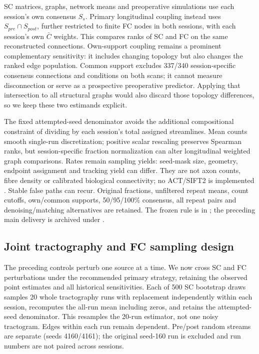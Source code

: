 \documentclass[11pt,a4paper]{article}
\begin{document}
SC matrices, graphs, network means and preoperative simulations use each session's own consensus $S_s$. Primary longitudinal coupling instead uses $S_{pre}\cap S_{post}$, further restricted to finite FC nodes in both sessions, with each session's own $\bar C$ weights. This compares ranks of SC and FC on the same reconstructed connections. Own-support coupling remains a prominent complementary sensitivity: it includes changing topology but also changes the ranked edge population. Common support excludes 337/340 session-specific consensus connections and conditions on both scans; it cannot measure disconnection or serve as a prospective preoperative predictor. Applying that intersection to all structural graphs would also discard those topology differences, so we keep these two estimands explicit.

The fixed attempted-seed denominator avoids the additional compositional constraint of dividing by each session's total assigned streamlines. Mean counts smooth single-run discretization; positive scalar rescaling preserves Spearman ranks, but session-specific fraction normalization can alter longitudinal weighted graph comparisons. Rates remain sampling yields: seed-mask size, geometry, endpoint assignment and tracking yield can differ. They are not axon counts, fibre density or calibrated biological connectivity; no ACT/SIFT2 is implemented \citep{maierhein2017,mrtrixconnectome}. Stable false paths can recur. Original fractions, unfiltered repeat means, count cutoffs, own/common supports, 50/95/100\% consensus, all repeat pairs and denoising/matching alternatives are retained. The frozen rule is in ; the preceding main delivery is archived under .

\subsection{Joint tractography and FC sampling design}\label{sec:jointmethods}
The preceding controls perturb one source at a time. We now cross SC and FC perturbations under the recommended primary strategy, retaining the observed point estimates and all historical sensitivities. Each of 500 SC bootstrap draws samples 20 whole tractography runs with replacement independently within each session, recomputes the all-run mean including zeros, and retains the attempted-seed denominator. This resamples the 20-run estimator, not one noisy tractogram. Edges within each run remain dependent. Pre/post random streams are separate (seeds 4160/4161); the original seed-160 run is excluded and run numbers are not paired across sessions.
\end{document}

